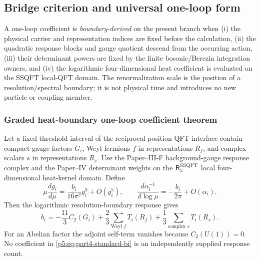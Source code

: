 \documentclass[12pt,a4paper]{article}
\begin{document}
\subsection{Bridge criterion and universal one-loop form}
\label{p5:sec:part4-bridge-criterion}

\begin{definition}
\label{p5:post:part4-bridge-criterion}
\label{p5:def:part4-bridge-criterion}
A one-loop coefficient is \emph{boundary-derived} on the present branch when
(i) the physical carrier and representation indices are fixed before the
calculation, (ii) the quadratic response blocks and gauge quotient descend
from the occurring action, (iii) their determinant powers are fixed by the
finite bosonic/Berezin integration owners, and (iv) the logarithmic
four-dimensional heat coefficient is evaluated on the SSQFT local-QFT domain.
The renormalization scale is the position of a resolution/spectral boundary;
it is not physical time and introduces no new particle or coupling member.
\end{definition}

\subsubsection{Graded heat-boundary one-loop coefficient theorem}
\begin{theorem}
\label{p5:thm:part4-standard-one-loop-bridge}
Let a fixed threshold interval of the reciprocal-position QFT interface
contain compact gauge factors \(G_i\), Weyl fermions \(f\) in
representations \(R_f\), and complex scalars \(s\) in representations
\(R_s\).  Use the Paper--III-F background-gauge response complex and the
Paper--IV determinant weights on the \(\mathsf R_5^{\rm SSQFT}\) local
four-dimensional heat-kernel domain.  Define
\begin{equation}
\label{p5:eq:part4-beta-sign-convention}
\mu\frac{dg_i}{d\mu}
=\frac{b_i}{16\pi^2}g_i^3+O(g_i^5),
\qquad
\frac{d\alpha_i^{-1}}{d\log\mu}
=-\frac{b_i}{2\pi}+O(\alpha_i).
\end{equation}
Then the logarithmic resolution-boundary response gives
\begin{equation}
\label{p5:eq:part4-standard-bi}
\boxed{
 b_i
 =
 -\frac{11}{3}C_2(G_i)
 +\frac{2}{3}\sum_{\text{Weyl }f}T_i(R_f)
 +\frac{1}{3}\sum_{\text{complex }s}T_i(R_s).
}
\end{equation}
For an Abelian factor the adjoint self-term vanishes because
$C_2(U(1))=0$.  No coefficient in
\eqref{p5:eq:part4-standard-bi} is an independently supplied response count.
\end{theorem}
\end{document}
